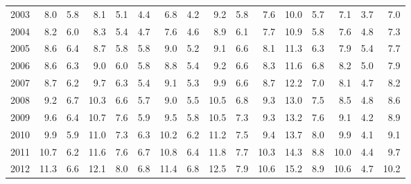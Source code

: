 \begin{tabular}{lrrrrrrrrrrrrrrr}
2003                    &      8.0 &              5.8 &           8.1 &        5.1 &            4.4 &             6.8 &          4.2 &         9.2 &          5.8 &       7.6 &          10.0 &            5.7 &      7.1 &          3.7 &   7.0 \\
2004                    &      8.2 &              6.0 &           8.3 &        5.4 &            4.7 &             7.6 &          4.6 &         8.9 &          6.1 &       7.7 &          10.9 &            5.8 &      7.6 &          4.8 &   7.3 \\
2005                    &      8.6 &              6.4 &           8.7 &        5.8 &            5.8 &             9.0 &          5.2 &         9.1 &          6.6 &       8.1 &          11.3 &            6.3 &      7.9 &          5.4 &   7.7 \\
2006                    &      8.6 &              6.3 &           9.0 &        6.0 &            5.8 &             8.8 &          5.4 &         9.2 &          6.6 &       8.3 &          11.6 &            6.8 &      8.2 &          5.0 &   7.9 \\
2007                    &      8.7 &              6.2 &           9.7 &        6.3 &            5.4 &             9.1 &          5.3 &         9.9 &          6.6 &       8.7 &          12.2 &            7.0 &      8.1 &          4.7 &   8.2 \\
2008                    &      9.2 &              6.7 &          10.3 &        6.6 &            5.7 &             9.0 &          5.5 &        10.5 &          6.8 &       9.3 &          13.0 &            7.5 &      8.5 &          4.8 &   8.6 \\
2009                    &      9.6 &              6.4 &          10.7 &        7.6 &            5.9 &             9.5 &          5.8 &        10.5 &          7.3 &       9.3 &          13.2 &            7.6 &      9.1 &          4.2 &   8.9 \\
2010                    &      9.9 &              5.9 &          11.0 &        7.3 &            6.3 &            10.2 &          6.2 &        11.2 &          7.5 &       9.4 &          13.7 &            8.0 &      9.9 &          4.1 &   9.1 \\
2011                    &     10.7 &              6.2 &          11.6 &        7.6 &            6.7 &            10.8 &          6.4 &        11.8 &          7.7 &      10.3 &          14.3 &            8.8 &     10.0 &          4.4 &   9.7 \\
2012                    &     11.3 &              6.6 &          12.1 &        8.0 &            6.8 &            11.4 &          6.8 &        12.5 &          7.9 &      10.6 &          15.2 &            8.9 &     10.6 &          4.7 &  10.2 \\

\end{tabular}
